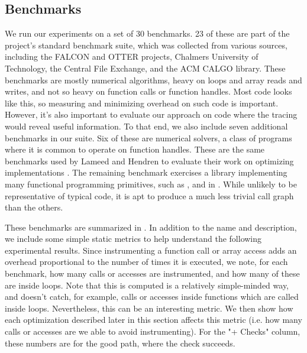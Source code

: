 \subsection{Benchmarks}

We run our experiments on a set of 30 \matlab benchmarks. 23 of these are part
of the \mclab project's standard benchmark suite, which was collected from
various sources, including the FALCON and OTTER projects, Chalmers University
of Technology, the \matlab Central File Exchange, and the ACM CALGO library.
These benchmarks are mostly numerical algorithms, heavy on loops and array
reads and writes, and not so heavy on function calls or function handles. Most
\matlab code looks like this, so measuring and minimizing overhead on such code
is important. However, it's also important to evaluate our approach on code
where the tracing would reveal useful information. To that end, we also include
seven additional benchmarks in our suite. Six of these are numerical solvers, a
class of programs where it is common to operate on function handles. These are
the same benchmarks used by Lameed and Hendren to evaluate their work on
optimizing  implementations \cite{OptimizingFeval}. The remaining
benchmark exercises a library implementing many functional programming
primitives, such as ,  and  in \matlab.
While unlikely to be representative of typical \matlab code, it is apt to
produce a much less trivial call graph than the others.

These benchmarks are summarized in . In
addition to the name and description, we include some simple static metrics to
help understand the following experimental results. Since instrumenting a
function call or array access adds an overhead proportional to the number of
times it is executed, we note, for each benchmark, how many calls or accesses
are instrumented, and how many of these are inside loops. Note that
this is computed is a relatively simple-minded way, and doesn't catch, for
example, calls or accesses inside functions which are called inside loops.
Nevertheless, this can be an interesting metric. We then show how each
optimization described later in this section affects this metric (i.e. how many
calls or accesses are we able to avoid instrumenting). For the "+ Checks" column,
these numbers are for the good path, where the check succeeds.


